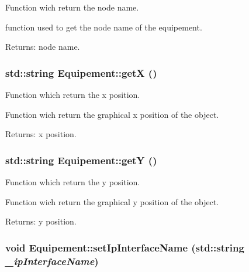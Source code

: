 Function wich return the node name. 

function used to get the node name of the equipement.

\begin{Desc}
\item[Returns:]node name. \end{Desc}
\hypertarget{class_equipement_a5f9ea9a69609f65b8c64cda70446b02}{
\subsubsection[{getX}]{\setlength{\rightskip}{0pt plus 5cm}std::string Equipement::getX ()}}
\label{class_equipement_a5f9ea9a69609f65b8c64cda70446b02}


Function which return the x position. 

Function wich return the graphical x position of the object.

\begin{Desc}
\item[Returns:]x position. \end{Desc}
\hypertarget{class_equipement_a3b627e52bd5bfddadd665ffbf88cbd4}{
\subsubsection[{getY}]{\setlength{\rightskip}{0pt plus 5cm}std::string Equipement::getY ()}}
\label{class_equipement_a3b627e52bd5bfddadd665ffbf88cbd4}


Function which return the y position. 

Function wich return the graphical y position of the object.

\begin{Desc}
\item[Returns:]y position. \end{Desc}
\hypertarget{class_equipement_cea2da7dead8d0b74c90933c422211c4}{
\subsubsection[{setIpInterfaceName}]{\setlength{\rightskip}{0pt plus 5cm}void Equipement::setIpInterfaceName (std::string {\em \_\-ipInterfaceName})}}
\label{class_equipement_cea2da7dead8d0b74c90933c422211c4}


